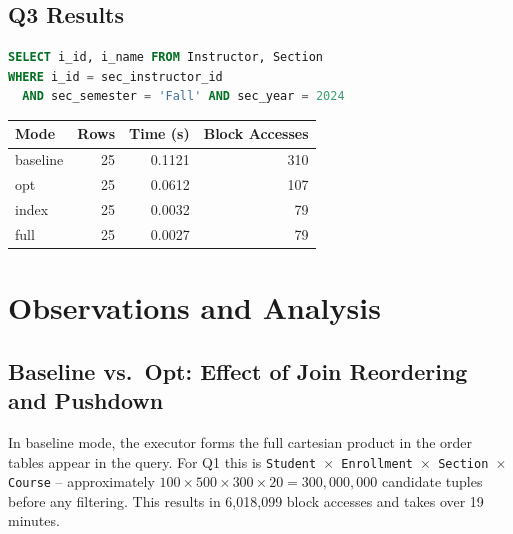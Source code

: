 \documentclass[12pt,a4paper]{article}
\begin{document}
\subsection{Q3 Results}

\begin{lstlisting}[style=sqlstyle,language=SQL]
SELECT i_id, i_name FROM Instructor, Section
WHERE i_id = sec_instructor_id
  AND sec_semester = 'Fall' AND sec_year = 2024
\end{lstlisting}

\begin{center}
  \begin{tabular}{l r r r}
    \toprule
    \textbf{Mode} & \textbf{Rows} & \textbf{Time (s)} & \textbf{Block Accesses} \\
    \midrule
    baseline      & 25            & 0.1121            & 310                     \\
    opt           & 25            & 0.0612            & 107                     \\
    index         & 25            & 0.0032            & 79                      \\
    full          & 25            & 0.0027            & 79                      \\
    \bottomrule
  \end{tabular}
\end{center}

\section{Observations and Analysis}

\subsection{Baseline vs.\ Opt: Effect of Join Reordering and Pushdown}

In baseline mode, the executor forms the full cartesian product in the order tables appear in the query. For Q1 this is \texttt{Student $\times$ Enrollment $\times$ Section $\times$ Course} -- approximately $100 \times 500 \times 300 \times 20 = 300{,}000{,}000$ candidate tuples before any filtering. This results in 6,018,099 block accesses and takes over 19 minutes.
\end{document}
